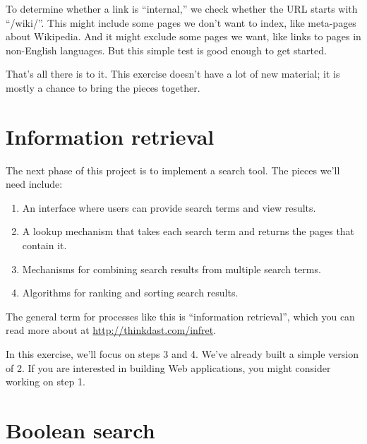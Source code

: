 \documentclass[12pt]{book}
\theoremstyle{exercise}
\begin{document}
To determine whether a link is ``internal,'' we check whether the URL
starts with ``/wiki/''. This might include some pages we don't want to
index, like meta-pages about Wikipedia. And it might exclude some pages
we want, like links to pages in non-English languages. But this simple
test is good enough to get started.


That's all there is to it. This exercise doesn't have a lot of new material;
it is mostly a chance to bring the pieces together.


\section{Information retrieval}
\label{information-retrieval}


The next phase of this project is to implement a search tool. The pieces
we'll need include:

\begin{enumerate}

\item
  An interface where users can provide search terms and view results.

\item
  A lookup mechanism that takes each search term and returns the pages
  that contain it.

\item
  Mechanisms for combining search results from multiple search terms.

\item
  Algorithms for ranking and sorting search results.

\end{enumerate}

The general term for processes like this is ``information retrieval'',
which you can read more about at 
\url{http://thinkdast.com/infret}.

In this exercise, we'll focus on steps 3 and 4. We've already built a simple
version of 2. If you are interested in building Web applications, you
might consider working on step 1.


\section{Boolean search}
\label{boolean-search}

\end{document}
